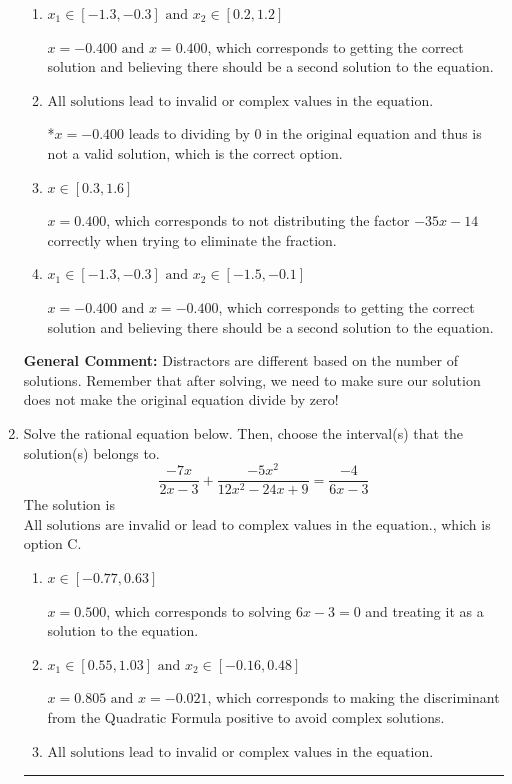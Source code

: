 \documentclass{extbook}[14pt]
\newcommand{\litem}[1]{\item #1

\rule{\textwidth}{0.4pt}}
\begin{document}
\begin{enumerate}
{\begin{enumerate}[label=\Alph*.]
$x = -0.400$, which corresponds to not checking if this value leads to dividing by 0 in the original equation and thus is not a valid solution.
\item \( x_1 \in [-1.3, -0.3] \text{ and } x_2 \in [0.2,1.2] \)

$x = -0.400 \text{ and } x = 0.400$, which corresponds to getting the correct solution and believing there should be a second solution to the equation.
\item \( \text{All solutions lead to invalid or complex values in the equation.} \)

*$x = -0.400$ leads to dividing by 0 in the original equation and thus is not a valid solution, which is the correct option.
\item \( x \in [0.3,1.6] \)

$x = 0.400$, which corresponds to not distributing the factor $-35x -14$ correctly when trying to eliminate the fraction.
\item \( x_1 \in [-1.3, -0.3] \text{ and } x_2 \in [-1.5,-0.1] \)

$x = -0.400 \text{ and } x = -0.400$, which corresponds to getting the correct solution and believing there should be a second solution to the equation.
\end{enumerate}

\textbf{General Comment:} Distractors are different based on the number of solutions. Remember that after solving, we need to make sure our solution does not make the original equation divide by zero!
}
\litem{
Solve the rational equation below. Then, choose the interval(s) that the solution(s) belongs to.
\[ \frac{-7x}{2x -3} + \frac{-5x^{2}}{12x^{2} -24 x + 9} = \frac{-4}{6x -3} \]The solution is \( \text{All solutions are invalid or lead to complex values in the equation.} \), which is option C.\begin{enumerate}[label=\Alph*.]
\item \( x \in [-0.77,0.63] \)

$x = 0.500$, which corresponds to solving $6x -3 = 0$ and treating it as a solution to the equation.
\item \( x_1 \in [0.55, 1.03] \text{ and } x_2 \in [-0.16,0.48] \)

$x = 0.805 \text{ and } x = -0.021$, which corresponds to making the discriminant from the Quadratic Formula positive to avoid complex solutions.
\item \( \text{All solutions lead to invalid or complex values in the equation.} \)


\end{enumerate}}
\end{enumerate}
\end{document}
